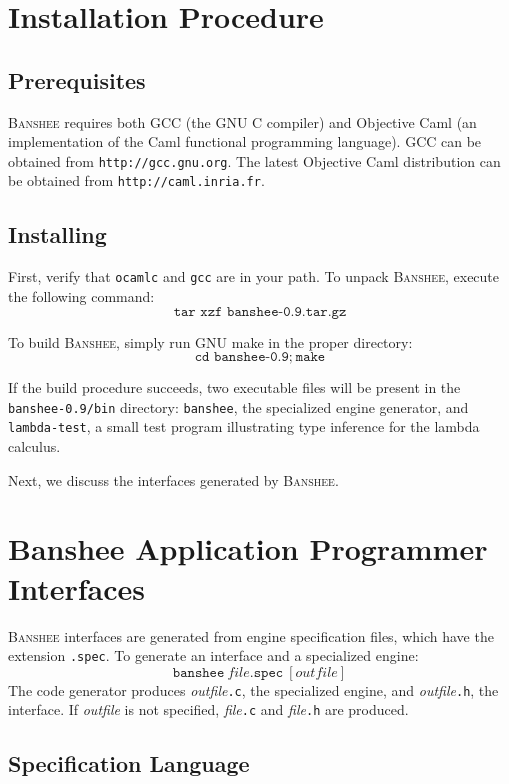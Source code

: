 \documentclass{article}
\newcommand{\banshee}{\textsc{Banshee}}
\begin{document}
\section{Installation Procedure}

\subsection{Prerequisites}
\banshee{} requires both GCC (the GNU C compiler) and Objective Caml (an implementation of the Caml functional programming language). GCC can be obtained from \texttt{http://gcc.gnu.org}. The latest Objective Caml distribution can be obtained from \texttt{http://caml.inria.fr}.

\subsection{Installing}

First, verify that \texttt{ocamlc} and \texttt{gcc} are in your path. 
To unpack \banshee{}, execute the following command:
$$
\texttt{tar xzf banshee-0.9.tar.gz}
$$

To build \banshee{}, simply run GNU make in the proper directory:
$$
\texttt{cd banshee-0.9;}~\texttt{make}
$$

If the build procedure succeeds, two executable files will be present in the \texttt{banshee-0.9/bin} directory: \texttt{banshee}, the specialized engine generator, and
\texttt{lambda-test}, a small test program illustrating type inference for the lambda calculus.

Next, we discuss the interfaces generated by \banshee{}.

\section{Banshee Application Programmer Interfaces}

\banshee{} interfaces are generated from engine specification files, which 
have the extension \texttt{.spec}. To generate an interface and a specialized 
engine:
$$
\texttt{banshee}~file\texttt{.spec}~[outfile]
$$
The code generator produces \textit{outfile}\texttt{.c}, the specialized 
engine, and \textit{outfile}\texttt{.h}, the interface. If \textit{outfile} 
is not specified, \textit{file}\texttt{.c} and \textit{file}\texttt{.h} are 
produced.

\subsection{Specification Language}
\end{document}
